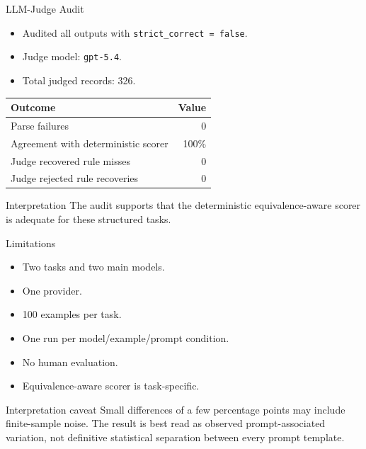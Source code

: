 \documentclass[aspectratio=169,11pt]{beamer}
\begin{document}
\begin{frame}{LLM-Judge Audit}
  \begin{itemize}
    \item Audited all outputs with \texttt{strict\_correct = false}.
    \item Judge model: \texttt{gpt-5.4}.
    \item Total judged records: 326.
  \end{itemize}

  \vspace{0.8em}
  \begin{table}
    \centering
    \begin{tabular}{lr}
      \toprule
      Outcome & Value \\
      \midrule
      Parse failures & 0 \\
      Agreement with deterministic scorer & 100\% \\
      Judge recovered rule misses & 0 \\
      Judge rejected rule recoveries & 0 \\
      \bottomrule
    \end{tabular}
  \end{table}

  \begin{block}{Interpretation}
    The audit supports that the deterministic equivalence-aware scorer is adequate for these structured tasks.
  \end{block}
\end{frame}

\begin{frame}{Limitations}
  \begin{itemize}
    \item Two tasks and two main models.
    \item One provider.
    \item 100 examples per task.
    \item One run per model/example/prompt condition.
    \item No human evaluation.
    \item Equivalence-aware scorer is task-specific.
  \end{itemize}

  \vspace{0.8em}
  \begin{block}{Interpretation caveat}
    Small differences of a few percentage points may include finite-sample noise. The result is best read as observed prompt-associated variation, not definitive statistical separation between every prompt template.
  \end{block}
\end{frame}
\end{document}
